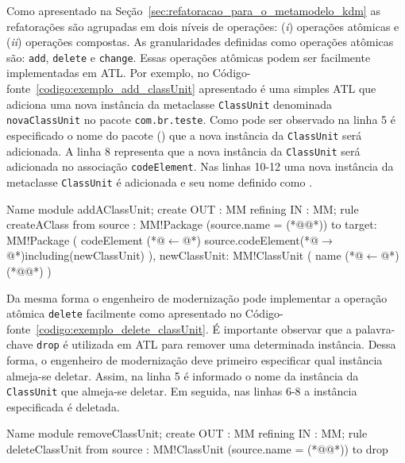 Como apresentado na Seção~\ref{sec:refatoracao_para_o_metamodelo_kdm} as refatorações são agrupadas em dois níveis de operações: (\textit{i}) operações atômicas e (\textit{ii}) operações compostas. As granularidades definidas como operações atômicas são: \texttt{add}, \texttt{delete} e \texttt{change}. Essas operações atômicas podem ser facilmente implementadas em ATL. Por exemplo, no Código-fonte~\ref{codigo:exemplo_add_classUnit} apresentado é uma simples ATL que adiciona uma nova instância da metaclasse \texttt{ClassUnit} denominada \texttt{novaClassUnit} no pacote \texttt{com.br.teste}. Como pode ser observado na linha 5 é especificado o nome do pacote () que a nova instância da \texttt{ClassUnit} será adicionada. A linha 8 representa que a nova instância da \texttt{ClassUnit} será adicionada no associação \texttt{codeElement}. Nas linhas 10-12 uma nova instância da metaclasse \texttt{ClassUnit} é adicionada e seu nome definido como .

\begin{codigo}[caption={[ATL para realizar a operação atômica \textit{add} \texttt{ClassUnit}.] ATL para realizar a operação atômica \textit{add} \texttt{ClassUnit}.},escapeinside={(*@}{@*)}, basicstyle=\footnotesize, label={codigo:exemplo_add_classUnit}, language=ATL]{Name}
module addAClassUnit;
create OUT : MM refining IN : MM;
rule createAClass{
	from
		source : MM!Package (source.name = (*@@*))
	to 
		target: MM!Package (
			codeElement (*@$\leftarrow$@*) source.codeElement(*@$\rightarrow$@*)including(newClassUnit)
		),
		newClassUnit: MM!ClassUnit (
			name (*@$\leftarrow$@*) (*@@*)
		)
}
\end{codigo}

Da mesma forma o engenheiro de modernização pode implementar a operação atômica \texttt{delete} facilmente como apresentado no Código-fonte~\ref{codigo:exemplo_delete_classUnit}. 
É importante observar que a  palavra-chave \texttt{drop} é utilizada em ATL para remover uma determinada instância. Dessa forma, o engenheiro de modernização deve primeiro especificar qual instância almeja-se deletar.  Assim, na linha 5 é informado o nome da instância da \texttt{ClassUnit} que almeja-se deletar. Em seguida, nas linhas 6-8 a instância especificada é deletada. 

\begin{codigo}[caption={[ATL para realizar a operação atômica \textit{delete} \texttt{ClassUnit}.] ATL para realizar a operação atômica \textit{delete} \texttt{ClassUnit}.},escapeinside={(*@}{@*)}, basicstyle=\footnotesize, label={codigo:exemplo_delete_classUnit}, language=ATL]{Name}
module removeClassUnit;
create OUT : MM refining IN : MM;
rule deleteClassUnit {
  from
      source : MM!ClassUnit (source.name = (*@@*))
  to
      drop
}
\end{codigo}

